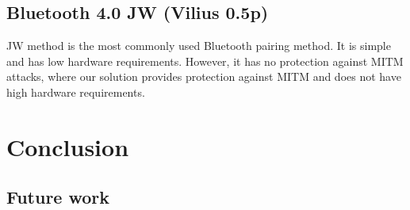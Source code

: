 \documentclass[12pt]{article}
\begin{document}
\newpage
\subsection{Bluetooth 4.0 JW (Vilius 0.5p)}
\label{sub:Bluetooth 4.0 JW}

JW method is the most commonly used Bluetooth pairing method. It is simple and has low hardware requirements. However, it has no protection against MITM attacks, where our solution provides protection against MITM and does not have high hardware requirements.

\section{Conclusion}
\label{sec:Conclusion}
\subsection{Future work}
\label{sub:future work}

\newpage


\nocite{*}

\end{document}
